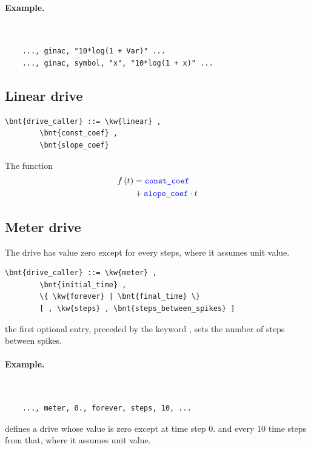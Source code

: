 \paragraph{Example.} \
\begin{verbatim}
    ..., ginac, "10*log(1 + Var)" ...
    ..., ginac, symbol, "x", "10*log(1 + x)" ...
\end{verbatim}

\subsection{Linear drive}\label{sec:DriveCaller:LINEAR}
\begin{Verbatim}[commandchars=\\\{\}]
    \bnt{drive_caller} ::= \kw{linear} ,
        \bnt{const_coef} ,
        \bnt{slope_coef}
\end{Verbatim}
The function
\begin{align}
	f\left( t \right) &= \textcolor{blue}{\texttt{const\_coef}} \nonumber \\
		&+ \textcolor{blue}{\texttt{slope\_coef}} \cdot t
\end{align}

\subsection{Meter drive}
The  drive has value zero except for every  steps,
where it assumes unit value.
\begin{Verbatim}[commandchars=\\\{\}]
    \bnt{drive_caller} ::= \kw{meter} ,
        \bnt{initial_time} ,
        \{ \kw{forever} | \bnt{final_time} \}
        [ , \kw{steps} , \bnt{steps_between_spikes} ]
\end{Verbatim}
the first optional entry, preceded by the keyword , sets the
number of steps between spikes.

\paragraph{Example.} \
\begin{verbatim}
    ..., meter, 0., forever, steps, 10, ...
\end{verbatim}
defines a drive whose value is zero except at time step 0. 
and every 10 time steps from that, where it assumes unit value.

